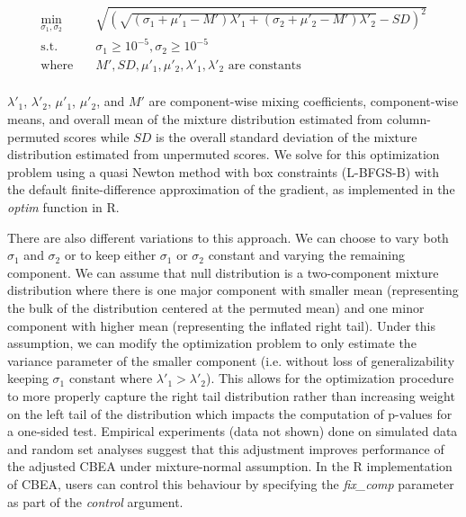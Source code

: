 \documentclass{article}
\begin{document}
\begin{equation} \label{eq:3}
\begin{aligned}
    \min_{\sigma_1, \sigma_2} \quad & \sqrt{\left(\sqrt{(\sigma_1 + \mu'_1 - M')\lambda'_1 + (\sigma_2 + \mu'_2 - M')\lambda'_2} - SD\right)^2}\\
    \textrm{s.t.}  \quad & \sigma_1 \geq 10^{-5}, \sigma_2 \geq 10^{-5}    \\
    \textrm{where} \quad & M', SD, \mu'_1, \mu'_2, \lambda'_1, \lambda'_2 \text{ are constants} \\
\end{aligned}
\end{equation}

$\lambda'_1$, $\lambda'_2$, $\mu'_1$, $\mu'_2$, and $M'$ are component-wise mixing coefficients, component-wise means, and overall mean of the mixture distribution estimated from column-permuted scores while $SD$ is the overall standard deviation of the mixture distribution estimated from unpermuted scores. We solve for this optimization problem using a quasi Newton method with box constraints (L-BFGS-B) with the default finite-difference approximation of the gradient, as implemented in the \emph{optim} function in R. 

There are also different variations to this approach. We can choose to vary both $\sigma_1$ and $\sigma_2$ or to keep either $\sigma_1$ or $\sigma_2$ constant and varying the remaining component. We can assume that null distribution is a two-component mixture distribution where there is one major component with smaller mean (representing the bulk of the distribution centered at the permuted mean) and one minor component with higher mean (representing the inflated right tail). Under this assumption, we can modify the optimization problem to only estimate the variance parameter of the smaller component (i.e. without loss of generalizability keeping $\sigma_1$ constant where $\lambda'_1 > \lambda'_2$). This allows for the optimization procedure to more properly capture the right tail distribution rather than increasing weight on the left tail of the distribution which impacts the computation of p-values for a one-sided test. Empirical experiments (data not shown) done on simulated data and random set analyses suggest that this adjustment improves performance of the adjusted CBEA under mixture-normal assumption. In the R implementation of CBEA, users can control this behaviour by specifying the \emph{fix\_comp} parameter as part of the \emph{control} argument.  
\end{document}
